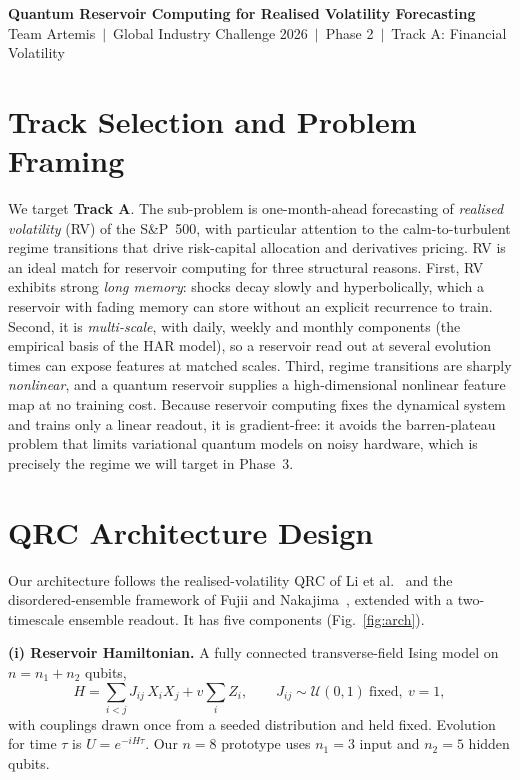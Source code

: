 \documentclass[11pt]{article}
\begin{document}
\begin{center}
{\large\bfseries Quantum Reservoir Computing for Realised Volatility Forecasting}\\[0.25em]
{\normalsize Team Artemis \,$|$\, Global Industry Challenge 2026 \,$|$\, Phase 2 \,$|$\, Track A: Financial Volatility}
\end{center}
\vspace{-0.3em}

\section{Track Selection and Problem Framing}
We target \textbf{Track A}. The sub-problem is one-month-ahead forecasting of \emph{realised volatility} (RV) of the S\&P~500, with particular attention to the calm-to-turbulent regime transitions that drive risk-capital allocation and derivatives pricing. RV is an ideal match for reservoir computing for three structural reasons. First, RV exhibits strong \emph{long memory}: shocks decay slowly and hyperbolically, which a reservoir with fading memory can store without an explicit recurrence to train. Second, it is \emph{multi-scale}, with daily, weekly and monthly components (the empirical basis of the HAR model), so a reservoir read out at several evolution times can expose features at matched scales. Third, regime transitions are sharply \emph{nonlinear}, and a quantum reservoir supplies a high-dimensional nonlinear feature map at no training cost. Because reservoir computing fixes the dynamical system and trains only a linear readout, it is gradient-free: it avoids the barren-plateau problem that limits variational quantum models on noisy hardware, which is precisely the regime we will target in Phase~3.

\section{QRC Architecture Design}
Our architecture follows the realised-volatility QRC of Li et al.~\cite{li2025} and the disordered-ensemble framework of Fujii and Nakajima~\cite{fujii2017}, extended with a two-timescale ensemble readout. It has five components (Fig.~\ref{fig:arch}).

\textbf{(i) Reservoir Hamiltonian.} A fully connected transverse-field Ising model on $n=n_1+n_2$ qubits,
\begin{equation}
H=\sum_{i<j} J_{ij}\,X_i X_j + v\sum_i Z_i,\qquad J_{ij}\sim\mathcal{U}(0,1)\ \text{fixed},\ v=1,
\label{eq:H}
\end{equation}
with couplings drawn once from a seeded distribution and held fixed. Evolution for time $\tau$ is $U=e^{-iH\tau}$. Our $n=8$ prototype uses $n_1=3$ input and $n_2=5$ hidden qubits.
\end{document}
